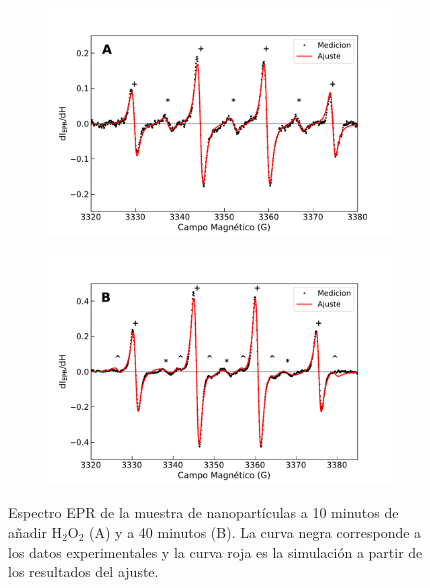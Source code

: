 \documentclass[aps,prl,reprint,superscriptaddress,showkeys]{revtex4-2}
\begin{document}
\begin{figure}[ht]
    \centering
    
    \begin{subfigure}
      \centering
      \includegraphics[width=0.95\linewidth]{ajuste_un_radical_lorentzian_10min.pdf}
    \end{subfigure}
    
    \vspace{0.1cm} %
    
    \begin{subfigure}
      \centering
      \includegraphics[width=0.95\linewidth]{ajuste_dos_radicales_lorentzian_40min.pdf}
      \label{fig:espectro}
    \end{subfigure}
    
    \caption{\centering Espectro EPR de la muestra de nanopartículas a 10 minutos de añadir H$_2$O$_2$ (A) y a 40 minutos (B). La curva negra corresponde a los datos experimentales y la curva roja es la simulación a partir de los resultados del ajuste.}
  \end{figure}
\end{document}
